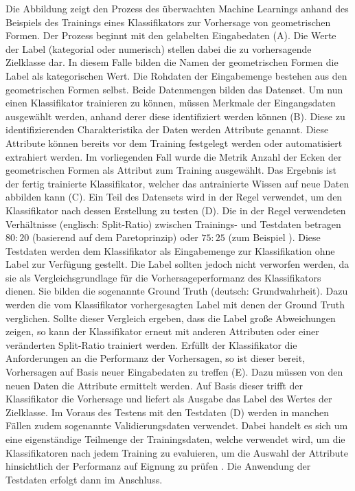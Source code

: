 Die Abbildung zeigt den Prozess des überwachten Machine Learnings anhand des Beispiels des Trainings eines Klassifikators zur Vorhersage von geometrischen Formen. Der Prozess beginnt mit den \glqq gelabelten\grqq{} Eingabedaten (A). Die Werte der Label (kategorial oder numerisch) stellen dabei die zu vorhersagende Zielklasse dar. In diesem Falle bilden die Namen der geometrischen Formen die Label als kategorischen Wert. Die Rohdaten der Eingabemenge bestehen aus den geometrischen Formen selbst. Beide Datenmengen bilden das Datenset. Um nun einen Klassifikator trainieren zu können, müssen Merkmale der Eingangsdaten ausgewählt werden, anhand derer diese identifiziert werden können (B). Diese zu identifizierenden Charakteristika der Daten werden Attribute genannt. Diese Attribute können bereits vor dem Training festgelegt werden oder automatisiert extrahiert werden. Im vorliegenden Fall wurde die Metrik \glqq Anzahl der Ecken der geometrischen Formen\grqq{} als Attribut zum Training ausgewählt. Das Ergebnis ist der fertig trainierte Klassifikator, welcher das antrainierte Wissen auf neue Daten abbilden kann (C). Ein Teil des Datensets wird in der Regel verwendet, um den Klassifikator nach dessen Erstellung zu testen (D). Die in der Regel verwendeten Verhältnisse (englisch: Split-Ratio) zwischen Trainings- und Testdaten betragen $80:20$ (basierend auf dem Paretoprinzip) oder $75:25$ (zum Beispiel \cite{Queiroz2016}). Diese Testdaten werden dem Klassifikator als Eingabemenge zur Klassifikation ohne Label zur Verfügung gestellt. Die Label sollten jedoch nicht verworfen werden, da sie als Vergleichsgrundlage für die Vorhersageperformanz des Klassifikators dienen. Sie bilden die sogenannte \glqq Ground Truth\grqq{} (deutsch: Grundwahrheit). Dazu werden die vom Klassifikator vorhergesagten Label mit denen der Ground Truth verglichen. Sollte dieser Vergleich ergeben, dass die Label große Abweichungen zeigen, so kann der Klassifikator erneut mit anderen Attributen oder einer veränderten Split-Ratio trainiert werden. Erfüllt der Klassifikator die Anforderungen an die Performanz der Vorhersagen, so ist dieser bereit, Vorhersagen auf Basis neuer Eingabedaten zu treffen (E). Dazu müssen von den neuen Daten die Attribute ermittelt werden. Auf Basis dieser trifft der Klassifikator die Vorhersage und liefert als Ausgabe das Label des Wertes der Zielklasse. Im Voraus des Testens mit den Testdaten (D) werden in manchen Fällen zudem sogenannte Validierungsdaten verwendet. Dabei handelt es sich um eine eigenständige Teilmenge der Trainingsdaten, welche verwendet wird, um die Klassifikatoren nach jedem Training zu evaluieren, um die Auswahl der Attribute hinsichtlich der Performanz auf Eignung zu prüfen \cite{Sammut2017}. Die Anwendung der Testdaten erfolgt dann im Anschluss.

